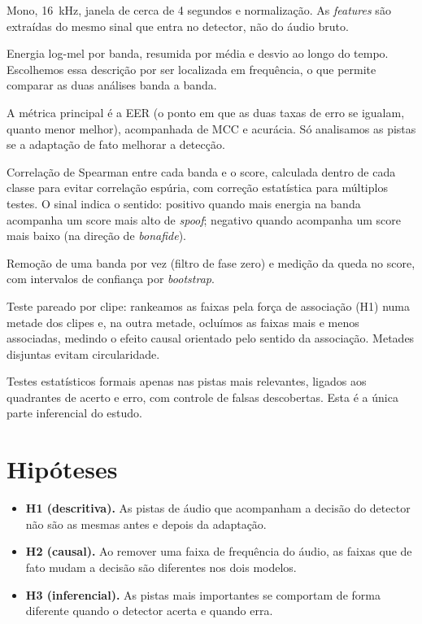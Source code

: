\documentclass[11pt,a4paper]{article}
\begin{document}
\begin{description}[leftmargin=1.4em]
  \item[Pré-processamento.] Mono, 16~kHz, janela de cerca de 4 segundos e
        normalização. As \emph{features} são extraídas do mesmo sinal que entra no
        detector, não do áudio bruto.
  \item[Descrição acústica.] Energia log-mel por banda, resumida por média e
        desvio ao longo do tempo. Escolhemos essa descrição por ser localizada em
        frequência, o que permite comparar as duas análises banda a banda.
  \item[Desempenho.] A métrica principal é a EER (o ponto em que as duas taxas de
        erro se igualam, quanto menor melhor), acompanhada de MCC e acurácia. Só
        analisamos as pistas se a adaptação de fato melhorar a detecção.
  \item[Análise associativa.] Correlação de Spearman entre cada banda e o score,
        calculada dentro de cada classe para evitar correlação espúria, com
        correção estatística para múltiplos testes. O sinal indica o sentido:
        positivo quando mais energia na banda acompanha um score mais alto de
        \emph{spoof}; negativo quando acompanha um score mais baixo (na direção de
        \emph{bonafide}).
  \item[Análise causal.] Remoção de uma banda por vez (filtro de fase zero) e
        medição da queda no score, com intervalos de confiança por \emph{bootstrap}.
  \item[Convergência.] Teste pareado por clipe: rankeamos as faixas pela força de
        associação (H1) numa metade dos clipes e, na outra metade, ocluímos as
        faixas mais e menos associadas, medindo o efeito causal orientado pelo
        sentido da associação. Metades disjuntas evitam circularidade.
  \item[Confirmatória.] Testes estatísticos formais apenas nas pistas mais
        relevantes, ligados aos quadrantes de acerto e erro, com controle de
        falsas descobertas. Esta é a única parte inferencial do estudo.
\end{description}

\section{Hipóteses}

\begin{itemize}[nosep]
  \item \textbf{H1 (descritiva).} As pistas de áudio que acompanham a decisão do
        detector não são as mesmas antes e depois da adaptação.
  \item \textbf{H2 (causal).} Ao remover uma faixa de frequência do áudio, as
        faixas que de fato mudam a decisão são diferentes nos dois modelos.
  \item \textbf{H3 (inferencial).} As pistas mais importantes se comportam de
        forma diferente quando o detector acerta e quando erra.
\end{itemize}
\end{document}
